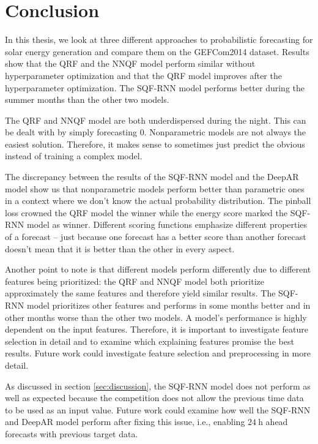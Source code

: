 \section{Conclusion}
\label{sec:conclusion}

In this thesis, we look at three different approaches to probabilistic forecasting 
for solar energy generation and compare them on the GEFCom2014 dataset. 
Results show that the QRF and the NNQF model perform similar without 
hyperparameter optimization and that the QRF model improves after the hyperparameter 
optimization. The SQF-RNN model performs better during the summer months than the other two models. 

The QRF and NNQF model are both underdispersed during the night. This can be dealt with by simply forecasting \(0\). 
Nonparametric models are not always the easiest solution. Therefore, it makes sense to sometimes just predict the obvious 
instead of training a complex model.

The discrepancy between the results of the SQF-RNN model and the DeepAR model show us that 
nonparametric models perform better than parametric ones in a context where we don't know the actual probability distribution. 
The pinball loss crowned the QRF model the winner while the energy score marked the SQF-RNN model as winner. 
Different scoring functions emphasize different properties of a forecast -- just because one forecast has a 
better score than another forecast doesn't mean that it is better than the other in every aspect.

Another point to note is that different models perform differently due to different features being 
prioritized: the QRF and NNQF model both prioritize approximately the same features and therefore 
yield similar results. The SQF-RNN model prioritizes other features and performs in some months better 
and in other months worse than the other two models. A model's performance is highly dependent on the input features.
Therefore, it is important to investigate feature selection in detail and to examine which explaining features promise the best results. 
Future work could investigate feature selection and preprocessing in more detail. 

As discussed in section \ref{sec:discussion}, the SQF-RNN model does not perform as well as expected 
because the competition does not allow the previous time data to be used as an input value. 
Future work could examine how well the SQF-RNN and DeepAR model perform after fixing this issue, 
i.e., enabling \(\SI{24}{\hour}\) ahead forecasts with previous target data. 